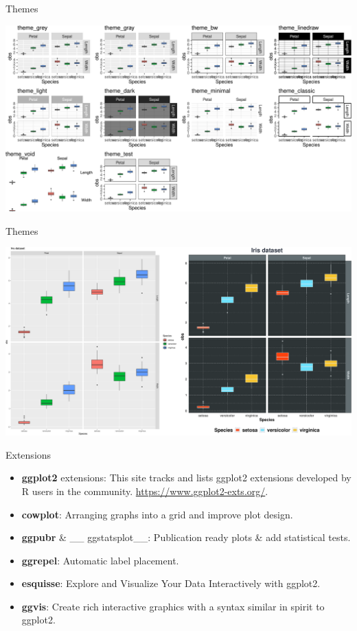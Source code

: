 \documentclass[14pt,ignorenonframetext,]{bredelebeamer}
\providecommand{\tightlist}{%
  \setlength{\itemsep}{0pt}\setlength{\parskip}{0pt}}
\begin{document}
\begin{frame}{Themes}

\includegraphics{tidyverse_28_03_files/figure-beamer/ggplot16-1.pdf}

\end{frame}

\begin{frame}{Themes}

\includegraphics{tidyverse_28_03_files/figure-beamer/ggplot17-1.pdf}

\end{frame}

\begin{frame}{Extensions}

\Large

\begin{itemize}
\tightlist
\item
  \textbf{ggplot2} extensions: This site tracks and lists ggplot2
  extensions developed by R users in the community.
  \url{https://www.ggplot2-exts.org/}.
\item
  \textbf{cowplot}: Arranging graphs into a grid and improve plot
  design.
\item
  \textbf{ggpubr} \& \_\_ ggstatsplot\_\_: Publication ready plots \&
  add statistical tests.
\item
  \textbf{ggrepel}: Automatic label placement.
\item
  \textbf{esquisse}: Explore and Visualize Your Data Interactively with
  ggplot2.
\item
  \textbf{ggvis}: Create rich interactive graphics with a syntax similar
  in spirit to ggplot2.
\end{itemize}

\end{frame}
\end{document}
